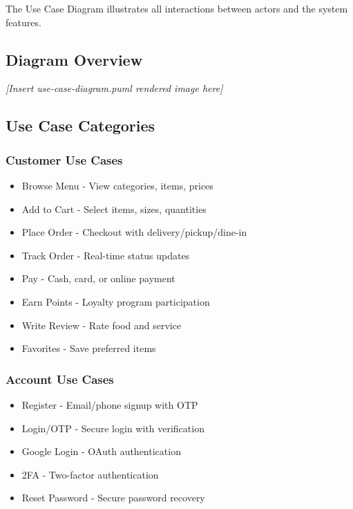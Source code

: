 \documentclass[12pt,a4paper]{article}
\begin{document}
The Use Case Diagram illustrates all interactions between actors and the system features.

\subsection{Diagram Overview}

\begin{center}
\textit{[Insert use-case-diagram.puml rendered image here]}
\end{center}

\subsection{Use Case Categories}

\subsubsection{Customer Use Cases}
\begin{itemize}
    \item Browse Menu - View categories, items, prices
    \item Add to Cart - Select items, sizes, quantities
    \item Place Order - Checkout with delivery/pickup/dine-in
    \item Track Order - Real-time status updates
    \item Pay - Cash, card, or online payment
    \item Earn Points - Loyalty program participation
    \item Write Review - Rate food and service
    \item Favorites - Save preferred items
\end{itemize}

\subsubsection{Account Use Cases}
\begin{itemize}
    \item Register - Email/phone signup with OTP
    \item Login/OTP - Secure login with verification
    \item Google Login - OAuth authentication
    \item 2FA - Two-factor authentication
    \item Reset Password - Secure password recovery
\end{itemize}
\end{document}
